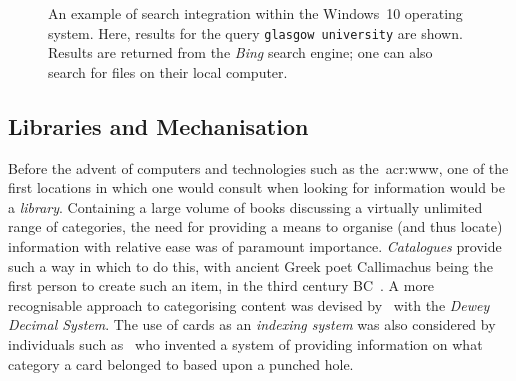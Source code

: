 \begin{figure}[t!]
    \centering
    \caption[Search Integration within Windows\textregistered~10]{An example of search integration within the Windows\textregistered~10 operating system. Here, results for the query \texttt{glasgow university} are shown. Results are returned from the \emph{Bing} search engine; one can also search for files on their local computer.}
    \label{fig:search_integration}
\end{figure}

\subsection{Libraries and Mechanisation}
Before the advent of computers and technologies such as the~\gls{acr:www}, one of the first locations in which one would consult when looking for information would be a \emph{library}. Containing a large volume of books discussing a virtually unlimited range of categories, the need for providing a means to organise (and thus locate) information with relative ease was of paramount importance. \emph{Catalogues} provide such a way in which to do this, with ancient Greek poet Callimachus being the first person to create such an item, in the third century BC~\citep{eliot2009companion}. A more recognisable approach to categorising content was devised by~\cite{dewey1891dcs} with the \emph{Dewey Decimal System}. The use of cards as an \emph{indexing system} was also considered by individuals such as~\cite{soper1920patent} who invented a system of providing information on what category a card belonged to based upon a punched hole.

